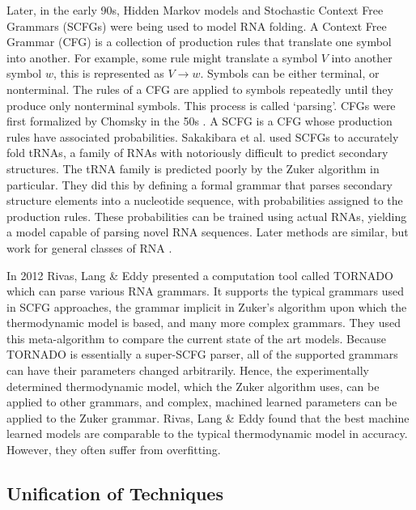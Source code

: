 \documentclass[12pt, a4paper]{article}
\begin{document}
Later, in the early 90s, Hidden Markov models and Stochastic Context Free Grammars (SCFGs) were being used to model RNA folding. A Context Free Grammar (CFG) is a collection of production rules that translate one symbol into another. For example, some rule might translate a symbol $V$ into another symbol $w$, this is represented as $V \rightarrow w$. Symbols can be either terminal, or nonterminal. The rules of a CFG are applied to symbols repeatedly until they produce only nonterminal symbols. This process is called `parsing'. CFGs were first formalized by Chomsky in the 50s \cite{chomsky1956three}. A SCFG is a CFG whose production rules have associated probabilities. Sakakibara et al. \cite{sakakibara1994stochastic} used SCFGs to accurately fold tRNAs, a family of RNAs with notoriously difficult to predict secondary structures. The tRNA family is predicted poorly by the Zuker algorithm in particular. They did this by defining a formal grammar that parses secondary structure elements into a nucleotide sequence, with probabilities assigned to the production rules. These probabilities can be trained using actual RNAs, yielding a model capable of parsing novel RNA sequences. Later methods are similar, but work for general classes of RNA \cite{dowell2004evaluation, knudsen2003pfold}.

In 2012 Rivas, Lang \& Eddy \cite{rivas2012range} presented a computation tool called TORNADO which can parse various RNA grammars. It supports the typical grammars used in SCFG approaches, the grammar implicit in Zuker's algorithm upon which the thermodynamic model is based, and many more complex grammars. They used this meta-algorithm to compare the current state of the art models. Because TORNADO is essentially a super-SCFG parser, all of the supported grammars can have their parameters changed arbitrarily. Hence, the experimentally determined thermodynamic model, which the Zuker algorithm uses, can be applied to other grammars, and complex, machined learned parameters can be applied to the Zuker grammar. Rivas, Lang \& Eddy found that the best machine learned models are comparable to the typical thermodynamic model in accuracy. However, they often suffer from overfitting.

\subsection{Unification of Techniques}
\end{document}
